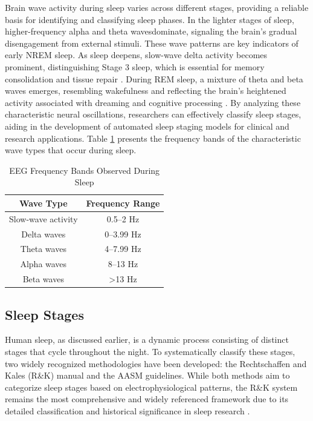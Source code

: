Brain wave activity during sleep varies across different stages, providing a reliable basis for identifying and classifying sleep phases. In the lighter stages of sleep, higher-frequency alpha and theta wavesdominate, signaling the brain’s gradual disengagement from external stimuli. These wave patterns are key indicators of early \ac{NREM} sleep. As sleep deepens, slow-wave delta activity becomes prominent, distinguishing Stage 3 sleep, which is essential for memory consolidation and tissue repair \parencite{sterpenich2007sleep}. During \ac{REM} sleep, a mixture of theta and beta waves emerges, resembling wakefulness and reflecting the brain's heightened activity associated with dreaming and cognitive processing \parencite{hobson2009rem}. By analyzing these characteristic neural oscillations, researchers can effectively classify sleep stages, aiding in the development of automated sleep staging models for clinical and research applications. Table \ref{tab:eeg_sleep_waves} presents the frequency bands of the characteristic wave types that occur during sleep.\\

\begin{table}[H]
    \centering
    \begin{tabular}{|c|c|}
        \hline
        \textbf{Wave Type} & \textbf{Frequency Range} \\ 
        \hline
        Slow-wave activity & 0.5–2 Hz \\ 
        \hline
        Delta waves & 0–3.99 Hz \\ 
        \hline
        Theta waves & 4–7.99 Hz \\ 
        \hline
        Alpha waves & 8–13 Hz \\ 
        \hline
        Beta waves & \textgreater 13 Hz \\ 
        \hline
    \end{tabular}
    \caption{EEG Frequency Bands Observed During Sleep}
    \label{tab:eeg_sleep_waves}
\end{table}

\subsection{Sleep Stages}

Human sleep, as discussed earlier, is a dynamic process consisting of distinct stages that cycle throughout the night. To systematically classify these stages, two widely recognized methodologies have been developed: the Rechtschaffen and Kales (R\&K) manual and the \ac{AASM} guidelines. While both methods aim to categorize sleep stages based on electrophysiological patterns, the R\&K system remains the most comprehensive and widely referenced framework due to its detailed classification and historical significance in sleep research \parencite{rechtschaffen1978techniques,iber2007aasm}.\\

